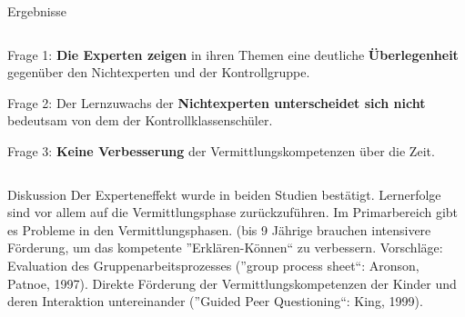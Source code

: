 \begin{alertblock}{Ergebnisse}
\begin{columns}[t,totalwidth=\twocolwid]
\begin{column}{\onecolwid}
\justifying
Frage 1: \textbf{Die Experten zeigen} in ihren Themen eine deutliche \textbf{Überlegenheit} gegenüber den Nichtexperten und der Kontrollgruppe.

Frage 2: Der Lernzuwachs der \textbf{Nichtexperten unterscheidet sich nicht} bedeutsam von dem der Kontrollklassenschüler.

Frage 3: \textbf{Keine Verbesserung} der Vermittlungskompetenzen über die Zeit.
\end{column}

\end{columns}
\end{alertblock}

\begin{block}{Diskussion}
Der Experteneffekt wurde in beiden Studien bestätigt. Lernerfolge sind vor allem auf die Vermittlungsphase zurückzuführen. Im Primarbereich gibt es Probleme in den Vermittlungsphasen. (bis 9 Jährige brauchen intensivere Förderung, um das kompetente ''Erklären-Können`` zu verbessern. Vorschläge: Evaluation des Gruppenarbeitsprozesses (''group process sheet``: Aronson, Patnoe, 1997). Direkte Förderung der Vermittlungskompetenzen der Kinder und deren Interaktion untereinander (''Guided Peer Questioning``: King, 1999).
\end{block}
